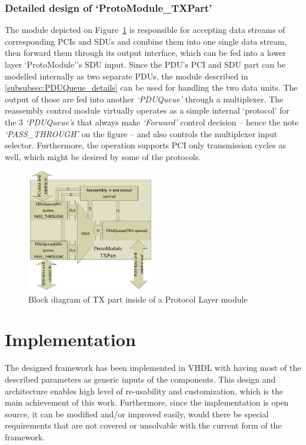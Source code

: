 \documentclass[conference]{IEEEtran}
\begin{document}
\subsubsection{Detailed design of `ProtoModule\_TXPart'}

The module depicted on Figure~\ref{fig:proto_layer_tx_sch} is responsible for accepting data streams of corresponding
PCIs and SDUs and combine them into one single data stream, then forward them through its output interface, which can
be fed into a lower layer `ProtoModule''s SDU input. Since the PDU's PCI and SDU part can be modelled internally as two
separate PDUs, the module described in \ref{subsubsec:PDUQueue_details} can be used for handling the two data units.
The output of those are fed into another \emph{`PDUQueue'} through a multiplexer. The reassembly control module
virtually operates as a simple internal `protocol' for the 3 \emph{`PDUQueue'}s that always make \emph{`Forward'}
control decision -- hence the note \emph{`PASS\_THROUGH'} on the figure -- and also controls the multiplexer input
selector. Furthermore, the operation supports PCI only transmission cycles as well, which might be desired by some of
the protocols.
\begin{figure}[!htb]
    \centering
    \includegraphics[width=0.5\textwidth]{figures_raw/proto_tx_part_imp.pdf}
    \caption{Block diagram of TX part inside of a Protocol Layer module}
    \label{fig:proto_layer_tx_sch}
\end{figure}

\section{Implementation}\label{sec:Implementation}

The designed framework has been implemented in VHDL with having most of the described parameters as generic inputs of
the components. This design and architecture enables high level of re-usability and customization, which is the main
achievement of this work. Furthermore, since the implementation is open source, it can be modified and/or improved
easily, would there be special requirements that are not covered or unsolvable with the current form of the framework.
\end{document}
